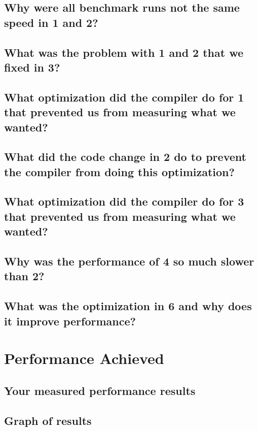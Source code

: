\documentclass{article}
\begin{document}
\subsection{Why were all benchmark runs not the same speed in 1 and 2?}

\subsection{What was the problem with 1 and 2 that we fixed in 3?}

\subsection{What optimization did the compiler do for 1 that prevented us from measuring what we wanted?}

\subsection{What did the code change in 2 do to prevent the compiler from doing this optimization?}

\subsection{What optimization did the compiler do for 3 that prevented us from measuring what we wanted?}

\subsection{Why was the performance of 4 so much slower than 2?}

\subsection{What was the optimization in 6 and why does it improve performance?}


\section{Performance Achieved}

\subsection{Your measured performance results}



\subsection{Graph of results}
\end{document}
